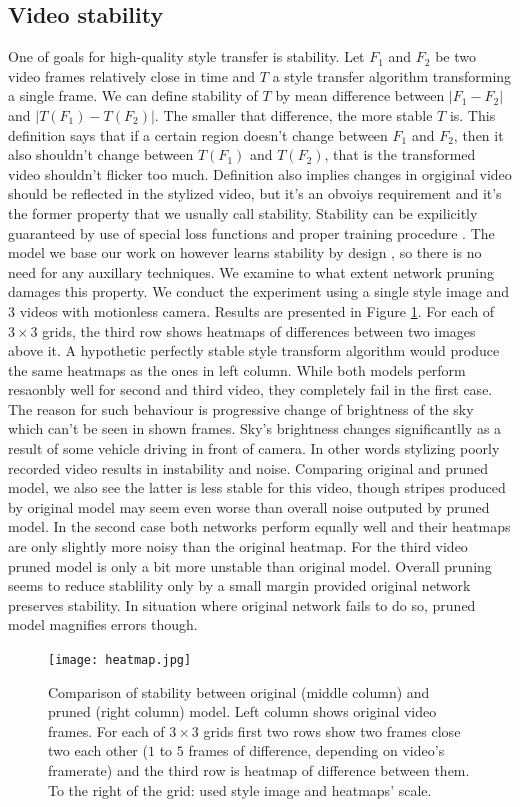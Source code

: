 \documentclass[../Main.tex]{subfiles}
\begin{document}
\subsection{Video stability}
One of goals for high-quality style transfer is stability. Let $F_1$ and $F_2$ be 
two video frames relatively close in time and $T$ a style transfer algorithm transforming
a single frame. We can define stability of $T$ by mean difference between
$| F_1 - F_2 |$ and $|T(F_1)-T(F_2)|$. The smaller that difference, the more stable $T$ is.
This definition says that if a certain region doesn't change between $F_1$ and $F_2$, then
it also shouldn't change between $T(F_1)$ and $T(F_2)$, that is the transformed video
shouldn't flicker too much. Definition also implies changes in orgiginal video
should be reflected in the stylized video, but it's an obvoiys requirement and it's
the former property that we usually call stability.
Stability can be expilicitly guaranteed by use of special loss functions
and proper training procedure \cite{stability1, stability2}. The model we base our work
on however learns stability by design \cite{Li2018}, so there is no need for
any auxillary techniques. We examine to what extent network pruning damages this 
property. We conduct the experiment using a single style image and 3 videos with motionless
camera. Results are presented in Figure \ref{fig:heatmap}.
For each of $3\times3$ grids, the third row shows heatmaps of differences between 
two images above it. A hypothetic perfectly stable style transform algorithm would
produce the same heatmaps as the ones in left column. While both models perform
resaonbly well for second and third video, they completely fail in the first case.
The reason for such behaviour is progressive change of brightness of the sky
which can't be seen in shown frames. Sky's brightness changes significantlly 
as a result of some vehicle driving in front of camera. In other words
stylizing poorly recorded video results in instability and noise. Comparing
original and pruned model, we also see the latter is less stable for this video,
though stripes produced by original model may seem even worse than overall
noise outputed by pruned model. In the second case both networks perform equally well
and their heatmaps are only slightly more noisy than the original heatmap.
For the third video pruned model is only a bit more unstable than original model.
Overall pruning seems to reduce stablility only by a small margin provided original network
preserves stability. In situation where original network fails to do so, pruned model
magnifies errors though.
\begin{figure}[h!]
\centering
    \texttt{[image: heatmap.jpg]}
    \caption{Comparison of stability between original (middle column) and pruned
    (right column) model. Left column shows original video frames. For each of
    $3\times3$ grids first two rows show two frames close two each other
    ($1$ to $5$ frames of difference, depending on video's framerate) and the third
    row is heatmap of difference between them. To the right of the grid: used style
    image and heatmaps' scale.
    }
    \label{fig:heatmap}
\end{figure} 
\end{document}
